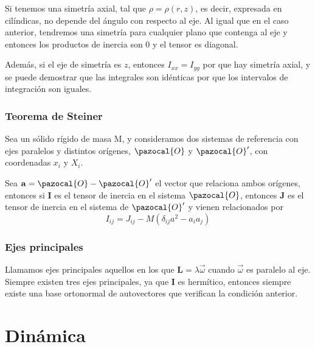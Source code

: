 Si tenemos una simetría axial, tal que $\rho = \rho(r,z)$, es decir, expresada en cilíndicas, no depende del ángulo con respecto al eje. Al igual que en el caso anterior, tendremos una simetría para cualquier plano que contenga al eje y entonces los productos de inercia son 0 y el tensor es diagonal.

Además, si el eje de simetría es $z$, entonces $I_{xx} = I_{yy}$ por que hay simetría axial, y se puede demostrar que las integrales son idénticas por que los intervalos de integración son iguales.
\subsubsection{Teorema de Steiner}
Sea un sólido rígido de masa M, y consideramos dos sistemas de referencia con ejes paralelos y distintos orígenes, $\pazocal{O}$ y $\pazocal{O}'$, con coordenadas $x_i$ y $X_i$.

Sea $\mathbf{a} = \pazocal{O}-\pazocal{O}'$ el vector que relaciona ambos orígenes, entonces si $\mathbf{I}$ es el tensor de inercia en el sistema $\pazocal{O}$, entonces $\mathbf{J}$ es el tensor de inercia en el sistema de $\pazocal{O}'$ y vienen relacionados por
\begin{equation} \label{6.1.1}
    I_{ij} = J_{ij} - M\left(\delta_{ij}a^2 -a_i a_j\right)
\end{equation} 
\vspace{-20pt}
\subsubsection{Ejes principales}
Llamamos ejes principales aquellos en los que $\mathbf{L} = \lambda \vec{\omega}$ cuando $\vec{\omega}$ es paralelo al eje.
Siempre existen tres ejes principales, ya que $\mathbf{I}$ es hermítico, entonces siempre existe una base ortonormal de autovectores que verifican la condición anterior.
\section{Dinámica}
